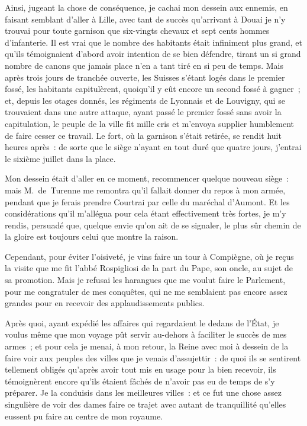 \documentclass[french,twoside]{book} %
\begin{document}
Ainsi, jugeant la chose de conséquence, je cachai mon dessein aux ennemis, en faisant semblant d’aller à Lille, avec tant de succès qu’arrivant à Douai je n’y trouvai pour toute garnison que six-vingts chevaux et sept cents hommes d’infanterie. Il est vrai que le nombre des habitants était infiniment plus grand, et qu’ils témoignaient d’abord avoir intention de se bien défendre, tirant un si grand nombre de canons que jamais place n’en a tant tiré en si peu de temps. Mais après trois jours de tranchée ouverte, les Suisses s’étant logés dans le premier fossé, les habitants capitulèrent, quoiqu’il y eût encore un second fossé à gagner ; et, depuis les otages donnés, les régiments de Lyonnais et de Louvigny, qui se trouvaient dans une autre attaque, ayant passé le premier fossé sans avoir la capitulation, le peuple de la ville fit mille cris et m’envoya supplier humblement de faire cesser ce travail. Le fort, où la garnison s’était retirée, se rendit huit heures après : de sorte que le siège n’ayant en tout duré que quatre jours, j’entrai le sixième juillet dans la place.\par
Mon dessein était d’aller en ce moment, recommencer quelque nouveau siège : mais M. de Turenne me remontra qu’il fallait donner du repos à mon armée, pendant que je ferais prendre Courtrai par celle du maréchal d’Aumont. Et les considérations qu’il m’allégua pour cela étant effectivement très fortes, je m’y rendis, persuadé que, quelque envie qu’on ait de se signaler, le plus sûr chemin de la gloire est toujours celui que montre la raison.\par
Cependant, pour éviter l’oisiveté, je vins faire un tour à Compiègne, où je reçus la visite que me fit l’abbé Rospigliosi de la part du Pape, son oncle, au sujet de sa promotion. Mais je refusai les harangues que me voulut faire le Parlement, pour me congratuler de mes conquêtes, qui ne me semblaient pas encore assez grandes pour en recevoir des applaudissements publics.\par
Après quoi, ayant expédié les affaires qui regardaient le dedans de l’État, je voulus même que mon voyage pût servir au-dehors à faciliter le succès de mes armes ; et pour cela je menai, à mon retour, la Reine avec moi à dessein de la faire voir aux peuples des villes que je venais d’assujettir : de quoi ils se sentirent tellement obligés qu’après avoir tout mis en usage pour la bien recevoir, ils témoignèrent encore qu’ils étaient fâchés de n’avoir pas eu de temps de s’y préparer. Je la conduisis dans les meilleures villes : et ce fut une chose assez singulière de voir des dames faire ce trajet avec autant de tranquillité qu’elles eussent pu faire au centre de mon royaume.\par
\end{document}
